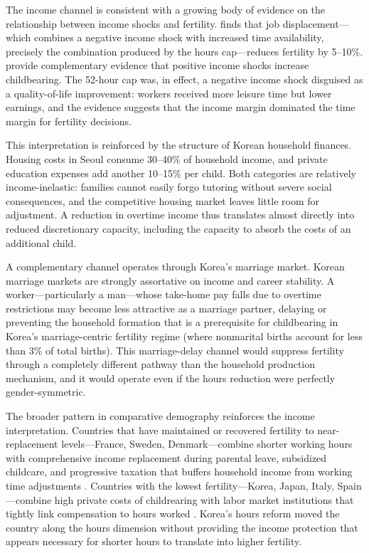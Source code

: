 \documentclass[12pt]{article}
\begin{document}
The income channel is consistent with a growing body of evidence on the relationship between income shocks and fertility. \citet{lindo2010children} finds that job displacement---which combines a negative income shock with increased time availability, precisely the combination produced by the hours cap---reduces fertility by 5--10\%. \citet{black2013stork} provide complementary evidence that positive income shocks increase childbearing. The 52-hour cap was, in effect, a negative income shock disguised as a quality-of-life improvement: workers received more leisure time but lower earnings, and the evidence suggests that the income margin dominated the time margin for fertility decisions.

This interpretation is reinforced by the structure of Korean household finances. Housing costs in Seoul consume 30--40\% of household income, and private education expenses add another 10--15\% per child. Both categories are relatively income-inelastic: families cannot easily forgo tutoring without severe social consequences, and the competitive housing market leaves little room for adjustment. A reduction in overtime income thus translates almost directly into reduced discretionary capacity, including the capacity to absorb the costs of an additional child.

A complementary channel operates through Korea's marriage market. Korean marriage markets are strongly assortative on income and career stability. A worker---particularly a man---whose take-home pay falls due to overtime restrictions may become less attractive as a marriage partner, delaying or preventing the household formation that is a prerequisite for childbearing in Korea's marriage-centric fertility regime (where nonmarital births account for less than 3\% of total births). This marriage-delay channel would suppress fertility through a completely different pathway than the household production mechanism, and it would operate even if the hours reduction were perfectly gender-symmetric.

The broader pattern in comparative demography reinforces the income interpretation. Countries that have maintained or recovered fertility to near-replacement levels---France, Sweden, Denmark---combine shorter working hours with comprehensive income replacement during parental leave, subsidized childcare, and progressive taxation that buffers household income from working time adjustments \citep{thevenon2011family, goldscheider2015gender}. Countries with the lowest fertility---Korea, Japan, Italy, Spain---combine high private costs of childrearing with labor market institutions that tightly link compensation to hours worked \citep{raymo2015marriage, esping1999social}. Korea's hours reform moved the country along the hours dimension without providing the income protection that appears necessary for shorter hours to translate into higher fertility.
\end{document}

